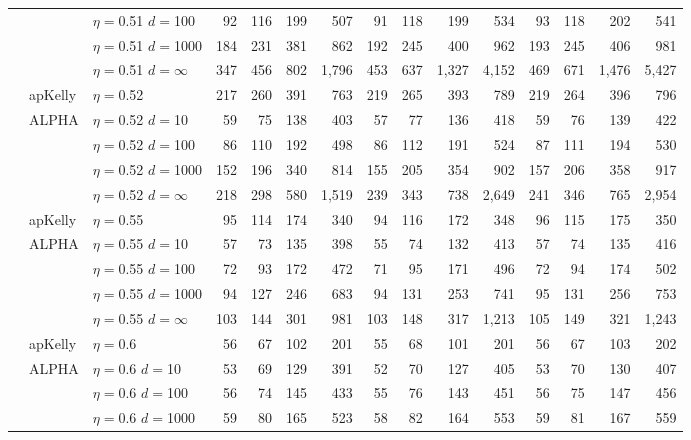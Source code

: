 \documentclass[12pt,runningheads]{llncs}
\begin{document}
{\begin{table}
\begin{tabular}{lll|rrrr|rrrr|rrrr}
&  & $\eta=$0.51 $d=$100 & 92  & 116  & 199  & 507  & 91  & 118  & 199  & 534  & 93  & 118  & 202  & 541  \\
&  & $\eta=$0.51 $d=$1000 & 184  & 231  & 381  & 862  & 192  & 245  & 400  & 962  & 193  & 245  & 406  & 981  \\
 &  & $\eta=$0.51 $d=\infty$ & 347  & 456  & 802  & 1,796  & 453  & 637  & 1,327  & 4,152  & 469  & 671  & 1,476  & 5,427  \\
\cline{2-15} & apKelly & $\eta=$0.52 & 217  & 260  & 391  & 763  & 219  & 265  & 393  & 789  & 219  & 264  & 396  & 796  \\
\cline{2-15}
& ALPHA & $\eta=$0.52 $d=$10 & 59  & 75  & 138  & 403  & 57  & 77  & 136  & 418  & 59  & 76  & 139  & 422  \\
&  & $\eta=$0.52 $d=$100 & 86  & 110  & 192  & 498  & 86  & 112  & 191  & 524  & 87  & 111  & 194  & 530  \\
&  & $\eta=$0.52 $d=$1000 & 152  & 196  & 340  & 814  & 155  & 205  & 354  & 902  & 157  & 206  & 358  & 917  \\
 &  & $\eta=$0.52 $d=\infty$ & 218  & 298  & 580  & 1,519  & 239  & 343  & 738  & 2,649  & 241  & 346  & 765  & 2,954  \\
\cline{2-15} & apKelly & $\eta=$0.55 & 95  & 114  & 174  & 340  & 94  & 116  & 172  & 348  & 96  & 115  & 175  & 350  \\
\cline{2-15}
& ALPHA & $\eta=$0.55 $d=$10 & 57  & 73  & 135  & 398  & 55  & 74  & 132  & 413  & 57  & 74  & 135  & 416  \\
&  & $\eta=$0.55 $d=$100 & 72  & 93  & 172  & 472  & 71  & 95  & 171  & 496  & 72  & 94  & 174  & 502  \\
&  & $\eta=$0.55 $d=$1000 & 94  & 127  & 246  & 683  & 94  & 131  & 253  & 741  & 95  & 131  & 256  & 753  \\
 &  & $\eta=$0.55 $d=\infty$ & 103  & 144  & 301  & 981  & 103  & 148  & 317  & 1,213  & 105  & 149  & 321  & 1,243  \\
\cline{2-15} & apKelly & $\eta=$0.6 & 56  & 67  & 102  & 201  & 55  & 68  & 101  & 201  & 56  & 67  & 103  & 202  \\
\cline{2-15}
& ALPHA & $\eta=$0.6 $d=$10 & 53  & 69  & 129  & 391  & 52  & 70  & 127  & 405  & 53  & 70  & 130  & 407  \\
&  & $\eta=$0.6 $d=$100 & 56  & 74  & 145  & 433  & 55  & 76  & 143  & 451  & 56  & 75  & 147  & 456  \\
&  & $\eta=$0.6 $d=$1000 & 59  & 80  & 165  & 523  & 58  & 82  & 164  & 553  & 59  & 81  & 167  & 559  \\

\end{tabular}
\end{table}}
\end{document}
